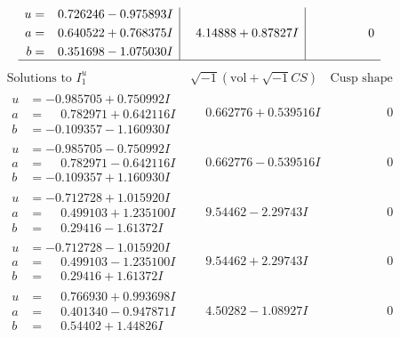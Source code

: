 \documentclass[1p]{elsarticle_modified}
\theoremstyle{definition}
\newcommand{\I}{\sqrt{-1}}
\begin{document}
$$\begin{array}{c|c|c}
\begin{aligned}
u &= \phantom{-}0.726246 - 0.975893 I \\
a &= \phantom{-}0.640522 + 0.768375 I \\
b &= \phantom{-}0.351698 - 1.075030 I\end{aligned}
 & \phantom{-}4.14888 + 0.87827 I & \phantom{-0.000000 } 0\\
 \hline 
 \end{array}$$\newpage$$\begin{array}{c|c|c}  
\text{Solutions to }I^u_{1}& \I (\text{vol} + \sqrt{-1}CS) & \text{Cusp shape}\\
 \hline 
\begin{aligned}
u &= -0.985705 + 0.750992 I \\
a &= \phantom{-}0.782971 + 0.642116 I \\
b &= -0.109357 - 1.160930 I\end{aligned}
 & \phantom{-}0.662776 + 0.539516 I & \phantom{-0.000000 } 0 \\ \hline\begin{aligned}
u &= -0.985705 - 0.750992 I \\
a &= \phantom{-}0.782971 - 0.642116 I \\
b &= -0.109357 + 1.160930 I\end{aligned}
 & \phantom{-}0.662776 - 0.539516 I & \phantom{-0.000000 } 0 \\ \hline\begin{aligned}
u &= -0.712728 + 1.015920 I \\
a &= \phantom{-}0.499103 + 1.235100 I \\
b &= \phantom{-}0.29416 - 1.61372 I\end{aligned}
 & \phantom{-}9.54462 - 2.29743 I & \phantom{-0.000000 } 0 \\ \hline\begin{aligned}
u &= -0.712728 - 1.015920 I \\
a &= \phantom{-}0.499103 - 1.235100 I \\
b &= \phantom{-}0.29416 + 1.61372 I\end{aligned}
 & \phantom{-}9.54462 + 2.29743 I & \phantom{-0.000000 } 0 \\ \hline\begin{aligned}
u &= \phantom{-}0.766930 + 0.993698 I \\
a &= \phantom{-}0.401340 - 0.947871 I \\
b &= \phantom{-}0.54402 + 1.44826 I\end{aligned}
 & \phantom{-}4.50282 - 1.08927 I & \phantom{-0.000000 } 0 \\ \hline\begin{aligned}

\end{aligned}
\end{array}$$
\end{document}
